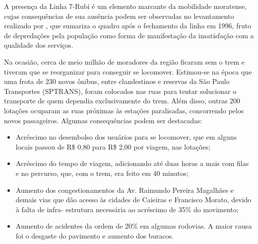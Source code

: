     A presença da Linha 7-Rubi é um elemento marcante da mobilidade moratense, cujas consequências de sua ausência podem ser observadas no levantamento realizado por \cite[p.32-33]{ferreira2010a}, que sumariza o quadro após o fechamento da linha em 1996, fruto de depredações pela população como forma de manifestação da insatisfação com a qualidade dos serviços.
    
    \begin{citacao}
    	Na ocasião, cerca de meio milhão de moradores da região ficaram sem o trem e tiveram que se reorganizar para conseguir se locomover. Estimou-se na época que uma frota de 230 novos ônibus, entre clandestinos e reservas da São Paulo Transportes (SPTRANS), foram colocados nas ruas para tentar solucionar o transporte de quem dependia exclusivamente do trem. Além disso, outras 200 lotações ocuparam as ruas próximas às estações paralisadas, concorrendo pelos novos passageiros. Algumas consequências podem ser destacadas:
    	
    	\begin{itemize}[leftmargin=\leftskip+-]
    		\item Acréscimo no desembolso dos usuários para se locomover, que em alguns locais
    	passou de R\$ 0,80 para R\$ 2,00 por viagem, nas lotações;
	    	\item Acréscimo do tempo de viagem, adicionando até duas horas a mais com filas e no
    	percurso, que, com o trem, era feito em 40 minutos;
	    	\item Aumento dos congestionamentos da Av. Raimundo Pereira Magalhães e demais vias
    	que dão acesso às cidades de Caieiras e Francisco Morato, devido à falta de infra-
    	estrutura necessária ao acréscimo de 35\% do movimento;
		    \item Aumento de acidentes da ordem de 20\% em algumas rodovias. A maior causa foi o
    	desgaste do pavimento e aumento dos buracos.
		\end{itemize}
    \end{citacao}
    
%
%

	\postextual
	
	
	
	
	\renewcommand{\glossaryname}{Glossário}
	\renewcommand*{\glsseeformat}[3][\seename]{\textit{#1}
		\glsseelist{#2}}
	

